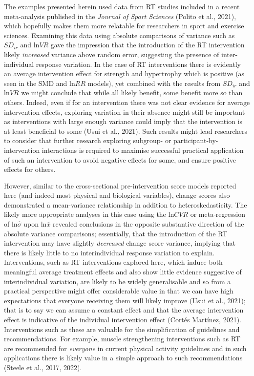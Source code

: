 \documentclass[
]{article}
\begin{document}
The examples presented herein used data from RT studies included in a recent meta-analysis published in the \emph{Journal of Sport Sciences} (Polito et al., 2021), which hopefully makes them more relatable for researchers in sport and exercise sciences. Examining this data using absolute comparisons of variance such as \(SD_{ir}\) and \(\textrm{ln}VR\) gave the impression that the introduction of the RT intervention likely \emph{increased} variance above random error, suggesting the presence of inter-individual response variation. In the case of RT interventions there is evidently an average intervention effect for strength and hypertrophy which is positive (as seen in the SMD and \(\textrm{ln}RR\) models), yet combined with the results from \(SD_{ir}\) and \(\textrm{ln}VR\) we might conclude that while all likely benefit, some benefit more so than others. Indeed, even if for an intervention there was not clear evidence for average intervention effects, exploring variation in their absence might still be important as interventions with large enough variance could imply that the intervention is at least beneficial to some (Usui et al., 2021). Such results might lead researchers to consider that further research exploring subgroup- or participant-by-intervention interactions is required to maximise successful practical application of such an intervention to avoid negative effects for some, and ensure positive effects for others.

However, similar to the cross-sectional pre-intervention score models reported here (and indeed most physical and biological variables), change scores also demonstrated a mean-variance relationship in addition to heteroskedasticity. The likely more appropriate analyses in this case using the \(\textrm{ln}CVR\) or meta-regression of \(\textrm{ln}\hat\sigma\) upon \(\textrm{ln}\overline{x}\) revealed conclusions in the opposite substantive direction of the absolute variance comparisons; essentially, that the introduction of the RT intervention may have slightly \emph{decreased} change score variance, implying that there is likely little to no interindividual response variation to explain. Interventions, such as RT interventions explored here, which induce both meaningful average treatment effects and also show little evidence suggestive of interindividual variation, are likely to be widely generalisable and so from a practical perspective might offer considerable value in that we can have high expectations that everyone receiving them will likely improve (Usui et al., 2021); that is to say we can assume a constant effect and that the average intervention effect is indicative of the individual intervention effect (Cortés Martínez, 2021). Interventions such as these are valuable for the simplification of guidelines and recommendations. For example, muscle strengthening interventions such as RT are recommended for \emph{everyone} in current physical activity guidelines and in such applications there is likely value in a simple approach to such recommendations (Steele et al., 2017, 2022).
\end{document}
